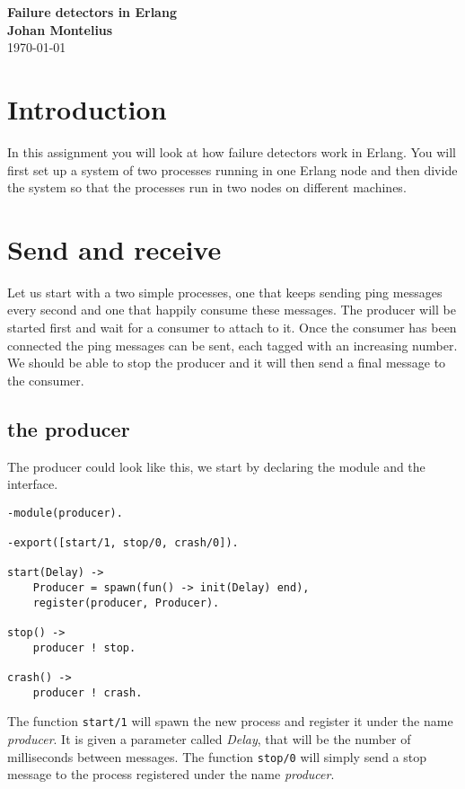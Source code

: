 \documentclass[a4paper, 11pt]{article}
\newcommand{\nnsection}[1]{
\section*{#1}
\addcontentsline{toc}{section}{#1}
}
\begin{document}
\begin{center}
\vspace{20pt}
\textbf{\large Failure detectors in Erlang}\\
\vspace{10pt}
\textbf{Johan Montelius}\\
\vspace{10pt}
\today{}
\end{center}

\nnsection{Introduction}

In this assignment you will look at how failure detectors work in
Erlang. You will first set up a system of two processes running in one
Erlang node and then divide the system so that the processes run in
two nodes on different machines.

\section{Send and receive}

Let us start with a two simple processes, one that keeps sending ping
messages every second and one that happily consume these messages. The
producer will be started first and wait for a consumer to attach to
it. Once the consumer has been connected the ping messages can be
sent, each tagged with an increasing number. We should be able to stop
the producer and it will then send a final message to the consumer.


\subsection{the producer}
 The
producer could look like this, we start by declaring the module and the interface.

\begin{verbatim}
-module(producer).

-export([start/1, stop/0, crash/0]).

start(Delay) ->
    Producer = spawn(fun() -> init(Delay) end),
    register(producer, Producer).
    
stop() ->
    producer ! stop.

crash() ->
    producer ! crash.
\end{verbatim}

The function {\tt start/1} will spawn the new process and register it
under the name {\em producer}. It is given a parameter called {\em
  Delay}, that will be the number of milliseconds between
messages. The function {\tt stop/0} will simply send a stop message
to the process registered under the name {\em producer}.
\end{document}
